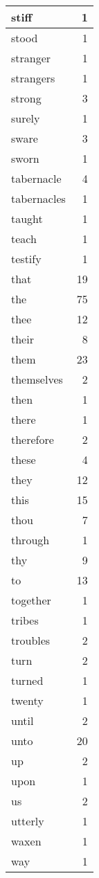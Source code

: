\begin{center}
\begin{longtable}{l|r}
stiff & 1 \\ \hline
stood & 1 \\ \hline
stranger & 1 \\ \hline
strangers & 1 \\ \hline
strong & 3 \\ \hline
surely & 1 \\ \hline
sware & 3 \\ \hline
sworn & 1 \\ \hline
tabernacle & 4 \\ \hline
tabernacles & 1 \\ \hline
taught & 1 \\ \hline
teach & 1 \\ \hline
testify & 1 \\ \hline
that & 19 \\ \hline
the & 75 \\ \hline
thee & 12 \\ \hline
their & 8 \\ \hline
them & 23 \\ \hline
themselves & 2 \\ \hline
then & 1 \\ \hline
there & 1 \\ \hline
therefore & 2 \\ \hline
these & 4 \\ \hline
they & 12 \\ \hline
this & 15 \\ \hline
thou & 7 \\ \hline
through & 1 \\ \hline
thy & 9 \\ \hline
to & 13 \\ \hline
together & 1 \\ \hline
tribes & 1 \\ \hline
troubles & 2 \\ \hline
turn & 2 \\ \hline
turned & 1 \\ \hline
twenty & 1 \\ \hline
until & 2 \\ \hline
unto & 20 \\ \hline
up & 2 \\ \hline
upon & 1 \\ \hline
us & 2 \\ \hline
utterly & 1 \\ \hline
waxen & 1 \\ \hline
way & 1 \\ \hline

\end{longtable}
\end{center}
